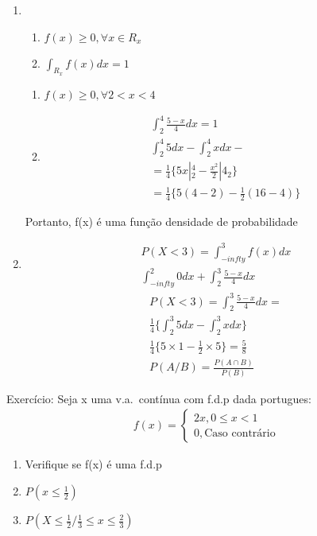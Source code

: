 \documentclass[11pt,a4paper]{article}
\begin{document}
\begin{enumerate}[label=(\alph*)]
  \item 
    \begin{enumerate} %
      \item $f(x)\geq 0, \forall x \in R_{x}$
      \item $\int_{R_{x}} f(x)dx=1$
    \end{enumerate}
    \begin{enumerate} %
      \item $f(x)\geq 0, \forall 2<x<4$
      \item 
        \begin{align*}
          \int_{2}^4 \frac{5-x}{4}dx=1\\
          \int_{2}^4 5 dx - \int_{2}^4 x dx - \\
          = \frac{1}{4} \{5x|^4_2 - \frac{x^2}{2}|4_2 \}\\
          = \frac{1}{4} \{5(4-2)- \frac{1}{2}(16-4)\}
        \end{align*}
    \end{enumerate}
    Portanto, f(x) é uma função densidade de probabilidade 
  \item 
    \begin{align}
      P(X<3)= \int_{-infty}^{3} f(x)dx \\
      \int_{-infty}^{2}0 dx +      \int_{2}^{3} \frac{5-x}{4} dx 
    \end{align}
    \begin{align}
      P(X<3)=\int_{2}^{3} \frac{5-x}{4} dx =\\
      \frac{1}{4}\{ \int_{2}^{3} 5 dx - \int_{2}^{3} x dx \}\\
      \frac{1}{4}\{ 5\times 1- \frac{1}{2}\times 5\}= \frac{5}{8}\\
      P(A/B)=\frac{P(A\cap B)}{P(B)}
    \end{align}
\end{enumerate}
Exercício: Seja x uma v.a.\ contínua com f.d.p dada portugues:
\begin{align}
  f(x)= 
  \begin{cases}
    2x, 0\le x < 1 \\ 
    0, \text{Caso contrário}
  \end{cases}
\end{align}
\begin{enumerate}[label=(\alph*)]
  \item Verifique se f(x) é uma f.d.p
  \item$ P(x\le \frac{1}{2})$
  \item $P(X\le \frac{1}{2} / \frac{1}{3} \le x \le \frac{2}{3})$
\end{enumerate}
\end{document}
